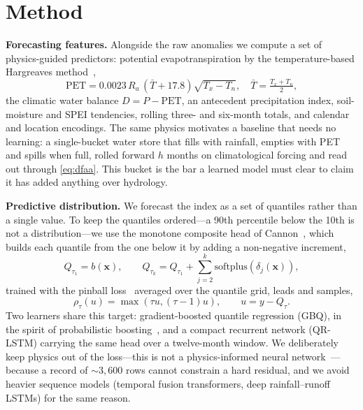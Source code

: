 \documentclass[conference]{IEEEtran}
\begin{document}
\section{Method}
\textbf{Forecasting features.} Alongside the raw anomalies we compute a set of physics-guided
predictors: potential evapotranspiration by the temperature-based Hargreaves method~\cite{hargreaves1985},
\begin{equation}
\mathrm{PET}=0.0023\,R_a\,(\bar{T}+17.8)\sqrt{T_x-T_n},\quad \bar{T}=\tfrac{T_x+T_n}{2},
\label{eq:pet}
\end{equation}
the climatic water balance $D=P-\mathrm{PET}$, an antecedent precipitation index, soil-moisture and SPEI
tendencies, rolling three- and six-month totals, and calendar and location encodings. The same physics
motivates a baseline that needs no learning: a single-bucket water store that fills with rainfall,
empties with PET and spills when full, rolled forward $h$ months on climatological forcing and read out
through \eqref{eq:dfaa}. This bucket is the bar a learned model must clear to claim it has added anything
over hydrology.

\textbf{Predictive distribution.} We forecast the index as a set of quantiles rather than a single
value. To keep the quantiles ordered---a 90th percentile below the 10th is not a distribution---we use
the monotone composite head of Cannon~\cite{cannon2018}, which builds each quantile from the one below it
by adding a non-negative increment,
\begin{equation}
Q_{\tau_1}=b(\mathbf{x}),\qquad
Q_{\tau_k}=Q_{\tau_1}+\sum_{j=2}^{k}\mathrm{softplus}\!\left(\delta_j(\mathbf{x})\right),
\label{eq:head}
\end{equation}
trained with the pinball loss~\cite{koenker1978} averaged over the quantile grid, leads and samples,
\begin{equation}
\rho_\tau(u)=\max\!\left(\tau u,(\tau-1)u\right),\qquad u=y-Q_\tau .
\label{eq:pinball}
\end{equation}
Two learners share this target: gradient-boosted quantile regression (GBQ), in the spirit of
probabilistic boosting~\cite{duan2020}, and a compact recurrent network (QR-LSTM) carrying the same head
over a twelve-month window. We deliberately keep physics out of the loss---this is not a
physics-informed neural network~\cite{raissi2019}---because a record of $\sim\!3{,}600$ rows cannot
constrain a hard residual, and we avoid heavier sequence models (temporal fusion transformers, deep
rainfall--runoff LSTMs) for the same reason.
\end{document}
